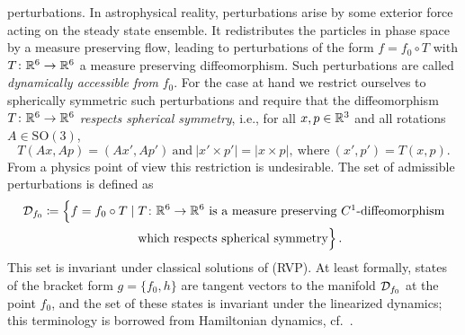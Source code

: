 \documentclass[11pt]{article}
\begin{document}
perturbations. In astrophysical reality, perturbations arise
by some exterior force acting on the steady state ensemble.
It redistributes the particles in phase space by
a measure preserving flow, leading to perturbations of
the form $f=f_0\circ T$ with $T\colon\mathbb R^6 \to \mathbb R^6$ a measure preserving
diffeomorphism. Such perturbations are called
{\em dynamically accessible from} $f_0$. For the case at hand we 
restrict ourselves to spherically symmetric such perturbations and require
that the diffeomorphism $T\colon\mathbb R^6 \to \mathbb R^6$
{\em respects spherical symmetry}, i.e., for all $x,p \in \mathbb R^3$ and all
rotations $A\in \mathrm{SO}(3)$,
\[
T(Ax,Ap)=(Ax',Ap')\
\mbox{and}\ |x' \times p'| = |x\times p|,\ \mbox{where}\ (x',p')=T(x,p).
\]
From a physics point of view this restriction is undesirable.
The set of admissible perturbations is defined as
\begin{align*}
  {\cal D}_{f_0} \coloneqq \Bigl\{ f=f_0 \circ T \mid 
  &
  \;T\colon \mathbb R^6 \to \mathbb R^6 \
  \mbox{is a measure preserving $C^1$-diffeomorphism}\\
  &
  \;\mbox{which respects spherical symmetry}\Bigr\}\,.
\end{align*}
This set is invariant under
classical solutions of (RVP).
At least formally, states of the bracket form $g=\{f_0,h\}$
are tangent vectors to the manifold ${\cal D}_{f_0}$ at the point $f_0$, and the set
of these states is invariant under the linearized
dynamics; this terminology is borrowed from Hamiltonian dynamics,
cf.~\cite{mor}.
\end{document}
